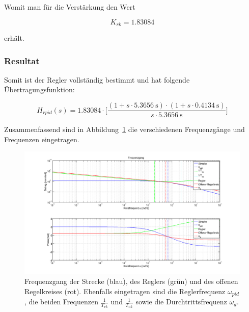 Womit man f\"ur die Verst\"arkung den Wert

\begin{equation} \label{eq:pid:k_rk_result}
    K_{rk} = 1.83084
\end{equation}

erh\"alt.

\subsubsection{Resultat}

Somit ist der Regler vollst\"andig bestimmt und hat folgende \"Ubertragungsfunktion:

\begin{equation} \label{eq:pid:result}
    H_{rpid}(s) = 1.83084 \cdot \biggl[ \frac{(1 + s \cdot \SI{5.3656}{\second} ) \cdot (1 + s \cdot \SI{0.4134}{\second} ) }{ s \cdot \SI{5.3656}{\second} } \biggr]
\end{equation}

Zusammenfassend sind in Abbildung~\ref{fig:pid:complete} die verschiedenen
Frequenzg\"ange und Frequenzen eingetragen.

\begin{figure}[h! width=\pagewidth]
    \includegraphics[width=\textwidth]{images/pidCompletePlot.png}
    \caption{%
        Frequenzgang der Strecke (blau), des  Reglers (gr\"un) und des offenen
        Regelkreises  (rot).  Ebenfalls  eingetragen  sind die  Reglerfrequenz
        $\omega_{pid}$,   die   beiden   Frequenzen   $\frac{1}{T_{vk}}$   und
        $\frac{1}{T_{nk}}$ sowie die Durchtrittsfrequenz $\omega_d$.
    }
    \label{fig:pid:complete}
\end{figure}
\clearpage
